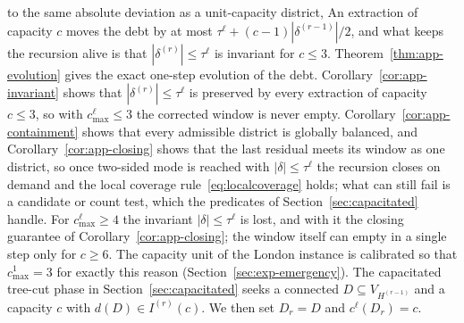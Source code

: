 \documentclass[preprint,12pt,authoryear]{elsarticle}
\theoremstyle{definition}
\begin{document}
to the same absolute deviation as a unit-capacity district, An extraction of capacity $c$ moves the debt by at most $\tau^{\ell} + (c-1)|\delta^{(r-1)}|/2$, and what keeps the recursion alive is that $|\delta^{(r)}| \leq \tau^{\ell}$ is invariant for $c \leq 3$. Theorem~\ref{thm:app-evolution} gives the exact one-step evolution of the debt. Corollary~\ref{cor:app-invariant} shows that $|\delta^{(r)}|\le\tau^{\ell}$ is preserved by every extraction of capacity $c\le 3$, so with $c^{\ell}_{\max}\le 3$ the corrected window is never empty. Corollary~\ref{cor:app-containment} shows that every admissible district is globally balanced, and Corollary~\ref{cor:app-closing} shows that the last residual meets its window as one district, so once two-sided mode is reached with $|\delta|\le\tau^{\ell}$ the recursion closes on demand and the local coverage rule~\eqref{eq:localcoverage} holds; what can still fail is a candidate or count test, which the predicates of Section~\ref{sec:capacitated} handle. For $c^{\ell}_{\max}\ge 4$ the invariant $|\delta|\le\tau^{\ell}$ is lost, and with it the closing guarantee of Corollary~\ref{cor:app-closing}; the window itself can empty in a single step only for $c \geq 6$. The capacity unit of the London instance is calibrated so that $c^1_{\max}=3$ for exactly this reason (Section~\ref{sec:exp-emergency}). The capacitated tree-cut phase in
Section~\ref{sec:capacitated} seeks a connected $D\subseteq V_{H^{(r-1)}}$ and a capacity $c$ with $d(D)\in I^{(r)}(c)$. We then set $D_r=D$ and $c^{\ell}(D_r)=c$.
\end{document}
